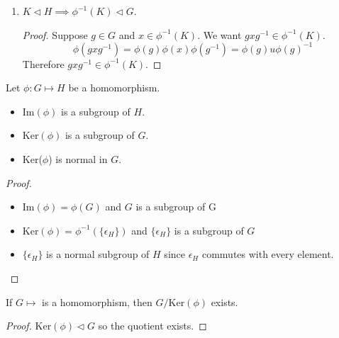 \documentclass[openany]{report}
\begin{document}
\begin{enumerate}[label=(\alph*)]
\begin{proof}
        $\phi^{-1}(K)$ is non-empty. So take 
        $$x,y \in \phi^{-1}(x) \implies \begin{cases}
            \phi(x)=u \in K\\
            \phi(y) = v \in K
        \end{cases}$$
        \[\phi(xy) = \phi(x)\phi(y) = uv \in K\]
        So $xy \in \phi^{-1}(K)$. Now take $x \in \phi^{-1}(x)$, using (b) we get
        \[\phi(x^{-1}) = \phi(x){-1} = \mu^{-1} \in K \implies x^{-1} \in \phi^{-1}(K)\]
        Therefore $\phi^{-1}(K) \leq G$.
    \end{proof}
    \item $K \triangleleft H \implies \phi^{-1}(K) \triangleleft G$.
    \begin{proof}
        Suppose $g \in G$ and $x \in \phi^{-1}(K)$. We want $gxg^{-1} \in \phi^{-1}(K)$. 
        \[\phi(gxg^{-1}) = \phi(g)\phi(x)\phi(g^{-1}) = \phi(g)u\phi(g)^{-1}\]
        Therefore $gxg^{-1} \in \phi^{-1}(K)$.
    \end{proof}
\end{enumerate}


\begin{corollary}
    Let $\phi: G \mapsto H$ be a homomorphism. 
    \begin{itemize}
        \item Im$(\phi)$ is a subgroup of $H$.
        \item Ker$(\phi)$ is a subgroup of $G$.
        \item Ker($\phi$) is normal in $G$.
    \end{itemize}
\end{corollary}

\begin{proof}
    \begin{itemize}
        \item Im$(\phi) = \phi(G)$ and $G$ is a subgroup of G
        \item Ker$(\phi) = \phi^{-1}(\{\epsilon_H\})$ and $\{\epsilon_H\}$ is a subgroup of $G$
        \item $\{\epsilon_H\}$ is a normal subgroup of $H$ since $\epsilon_H$ commutes with every element.
    \end{itemize}
\end{proof}

\begin{theorem}
    If $G \mapsto$ is a homomorphism, then $G / $Ker$(\phi)$ exists.
\end{theorem}
\begin{proof}
    Ker$(\phi) \triangleleft G$ so the quotient exists. 
\end{proof}
\end{document}
